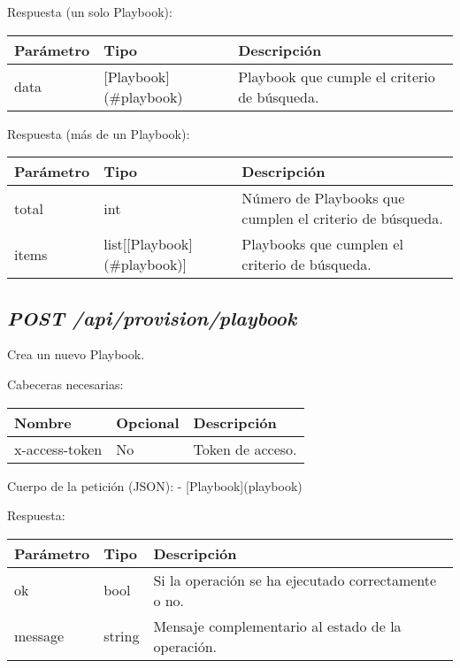 		Respuesta (un solo Playbook):
		\begin{table}[h!]
			\centering
	\begin{adjustbox}{max width=\textwidth}
			\begin{tabular}{|l|l|l|}
				\hline
				Parámetro & Tipo & Descripción \\ \hline
				data & [Playbook](\#playbook) & Playbook que cumple el criterio de búsqueda. \\ \hline
			\end{tabular}
\end{adjustbox}
		\end{table}
		
		Respuesta (más de un Playbook):
		\begin{table}[h!]
			\centering
	\begin{adjustbox}{max width=\textwidth}
			\begin{tabular}{|l|l|l|}
				\hline
				Parámetro & Tipo & Descripción \\ \hline
				total & int & Número de Playbooks que cumplen el criterio de búsqueda. \\ \hline
				items & list[[Playbook](\#playbook)] & Playbooks que cumplen el criterio de búsqueda. \\ \hline
			\end{tabular}
\end{adjustbox}
		\end{table}
	
	
	
	\subsection{\textit{POST /api/provision/playbook}}
		Crea un nuevo Playbook.
		
		Cabeceras necesarias:
		\begin{table}[h!]
			\centering
	\begin{adjustbox}{max width=\textwidth}
			\begin{tabular}{|l|l|l|}
				\hline
				Nombre & Opcional & Descripción \\ \hline
				x-access-token & No & Token de acceso. \\ \hline
			\end{tabular}
\end{adjustbox}
		\end{table}
		
		Cuerpo de la petición (JSON):
		- [Playbook](playbook)
		
		Respuesta:
		\begin{table}[!h]
			\centering
	\begin{adjustbox}{max width=\textwidth}
			\begin{tabular}{|l|l|l|}
				\hline
				Parámetro & Tipo & Descripción \\ \hline
				ok & bool & Si la operación se ha ejecutado correctamente o no. \\ \hline
				message & string & Mensaje complementario al estado de la operación. \\ \hline
			\end{tabular}
\end{adjustbox}
	\end{table}
	
